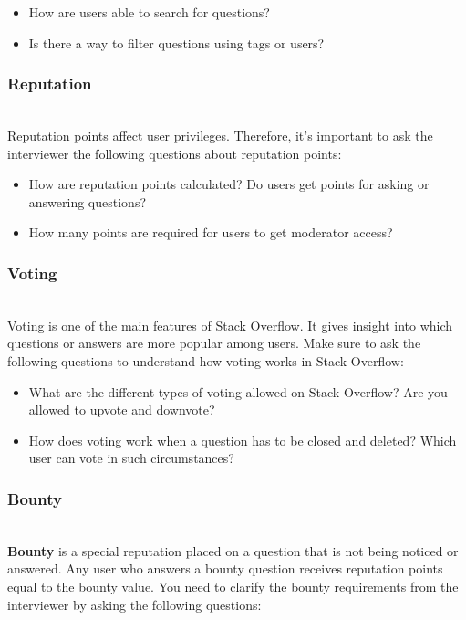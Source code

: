 \begin{itemize}
\item
\protect{}\label{NjKaAJcJ9_MIX9Lm0wuN_}
How are users able to search for questions?
\item
\protect{}\label{JS1NLpiyKJy4Wr9YoYW2b}
Is there a way to filter questions using tags or users?
\end{itemize}

\subsubsection{Reputation}\label{7w9wz8d3z3SrYaignOMM2}
\\
Reputation points affect user privileges. Therefore, it's important to ask the interviewer the following questions about reputation points:

\begin{itemize}
\item
How are reputation points calculated? Do users get points for asking or answering questions?
\item
How many points are required for users to get moderator access?
\end{itemize}

\subsubsection{Voting}\label{K-LK1TR9AJoexdLA30XCE}
\\
Voting is one of the main features of Stack Overflow. It gives insight into which questions or answers are more popular among users. Make sure to ask the following questions to understand how voting works in Stack Overflow:

\begin{itemize}
\item
\protect{}\label{RuNzA7aMck_w9R_hNbdiT}
What are the different types of voting allowed on Stack Overflow? Are you allowed to upvote and downvote?
\item
\protect{}\label{-yoZuSIKK-wtwDp6WioQW}
How does voting work when a question has to be closed and deleted? Which user can vote in such circumstances?
\end{itemize}

\subsubsection{Bounty}\label{y4RSc0MQ3ARuKSoGPKUc_}
\\
\textbf{Bounty} is a special reputation placed on a question that is not being noticed or answered. Any user who answers a bounty question receives reputation points equal to the bounty value. You need to clarify the bounty requirements from the interviewer by asking the following questions:

